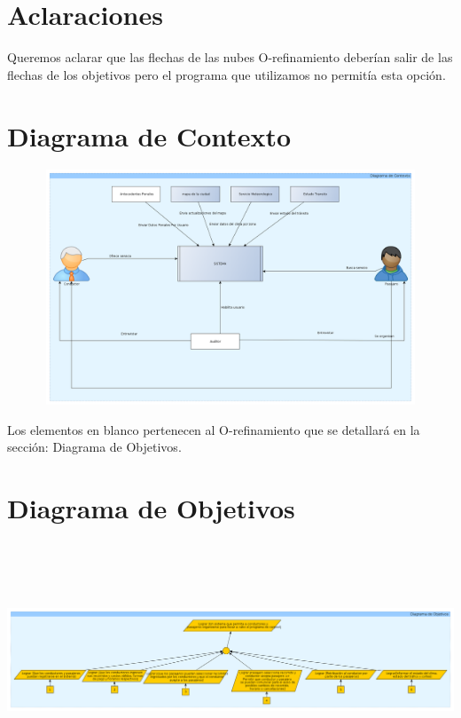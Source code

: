 \documentclass[a4paper,titlepage,10pt]{article}
\begin{document}
 

\maketitle

\section{Aclaraciones} %
Queremos aclarar que las flechas de las nubes O-refinamiento deberían salir de las flechas de los objetivos pero el programa que utilizamos no permitía esta opci\'on.

\section{Diagrama de Contexto} %

\includegraphics[height=7cm,width=17cm]{imagenes/contexto.png}

Los elementos en blanco pertenecen al O-refinamiento que se detallará en la secci\'on: Diagrama de Objetivos.

\newpage

\section{Diagrama de Objetivos} %

\includegraphics[height=7cm,width=19.5cm]{imagenes/root.png}
\end{document}
